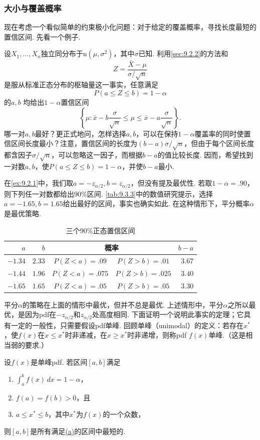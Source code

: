 \subsubsection{大小与覆盖概率}\label{sec:9.3.1}
现在考虑一个看似简单的约束极小化问题：对于给定的覆盖概率，寻找长度最短的置信区间. 先看一个例子.
\begin{example}[长度的优化]\label{ex:9.3.1}
设$X_1,\ldots,X_n$独立同分布于$\mathrm n(\mu,\sigma^2)$，其中$\sigma$已知. 利用\autoref{sec:9.2.2}的方法和
$$Z=\frac{\bar X-\mu}{\sigma/\sqrt n}$$
是服从标准正态分布的枢轴量这一事实，任意满足
$$P(a\le Z\le b)=1-\alpha$$
的$a,b$
均给出$1-\alpha$置信区间
$$\left\{\mu:\bar x-b\frac\sigma{\sqrt n}\le\mu\le\bar x-a\frac\sigma{\sqrt n}\right\}.$$
哪一对$a,b$最好？更正式地问，怎样选择$a,b$，可以在保持$1-\alpha$覆盖率的同时使置信区间长度最小？注意，置信区间的长度为$(b-a)\sigma/\sqrt n$，但由于每个区间长度都含因子$\sigma/\sqrt n$，可以忽略这一因子，而根据$b-a$的值比较长度. 因而，希望找到一对数$a,b$，使$P(a\le Z\le b)=1-\alpha$，并使$b-a$最小.

在\autoref{ex:9.2.1}中，我们取$a=-z_{\alpha/2},b=z_{\alpha/2}$，但没有提及最优性. 若取$1-\alpha=.90$，则下列任一对数都给出$90\%$区间. \autoref{tab:9.3.3}中的数值研究提示，选择$a=-1.65,b=1.65$给出最好的区间，事实也确实如此. 在这种情形下，平分概率$\alpha$是最优策略.
\par
\begin{table}[htbp]\centering
\setcounter{table}{2}
\caption{三个$90\%$正态置信区间}\label{tab:9.3.3}
\begin{tabular}{rrccr}\toprule
$a$&$b$&\multicolumn{2}{c}{概率}&$b-a$\\\midrule
$-1.34$&$2.33$&$P(Z<a)=.09$&$P(Z>b)=.01$&$3.67$\\
$-1.44$&$1.96$&$P(Z<a)=.075$&$P(Z>b)=.025$&$3.40$\\
$-1.65$&$1.65$&$P(Z<a)=.05$&$P(Z>b)=.05$&$3.30$\\\bottomrule
\end{tabular}
\end{table}
\par
\end{example}
平分$\alpha$的策略在上面的情形中最优，但并不总是最优. 上述情形中，平分$\alpha$之所以最优，是因为pdf在$-z_{\alpha/2}$和$z_{\alpha/2}$处高度相同. 下面证明一个说明此事实的定理；它具有一定的一般性，只需要假设pdf单峰. 回顾单峰（unimodal）的定义：若存在$x^*$，使$f(x)$在$x\le x^*$时非递减，在$x\ge x^*$时非递增，则称pdf $f(x)$单峰.（这是相当弱的要求.）
\begin{theorem}\label{thm:9.3.2}
设$f(x)$是单峰pdf. 若区间$[a,b]$满足
\begin{enumerate}[label=\roman*.]
\item\label{item:9.3.2.i}$\int_a^b f(x)\,dx=1-\alpha$，
\item\label{item:9.3.2.ii}$f(a)=f(b)>0$，且
\item\label{item:9.3.2.iii}$a\le x^*\le b$，其中$x^*$为$f(x)$的一个众数，
\end{enumerate}
则$[a,b]$是所有满足\hyperref[item:9.3.2.i]{(a)}的区间中最短的.
\end{theorem}
